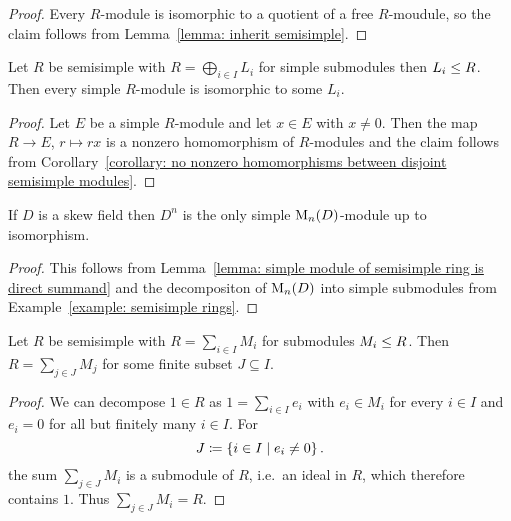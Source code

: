 \begin{proof}
  Every $R$-module is isomorphic to a quotient of a free $R$-moudule, so the claim follows from Lemma~\ref{lemma: inherit semisimple}.
\end{proof}


\begin{lemma}
  \label{lemma: simple module of semisimple ring is direct summand}
  Let $R$ be semisimple with $R = \bigoplus_{i \in I} L_i$ for simple submodules then $L_i \leq R$.
  Then every simple $R$-module is isomorphic to some $L_i$.
\end{lemma}


\begin{proof}
  Let $E$ be a simple $R$-module and let $x \in E$ with $x \neq 0$.
  Then the map $R \to E$, $r \mapsto rx$ is a nonzero homomorphism of $R$-modules and the claim follows from Corollary~\ref{corollary: no nonzero homomorphisms between disjoint semisimple modules}.
\end{proof}


\begin{corollary}
  \label{corollary: D^n is the only simple M_n(D)-module}
  If $D$ is a skew field then $D^n$ is the only simple $\operatorname{M}_n(D)$-module up to isomorphism.
\end{corollary}


\begin{proof}
  This follows from Lemma~\ref{lemma: simple module of semisimple ring is direct summand} and the decompositon of $\operatorname{M}_n(D)$ into simple submodules from Example~\ref{example: semisimple rings}.
\end{proof}


\begin{lemma}
  \label{lemma: ring is already finite sum of submodules}
  Let $R$ be semisimple with $R = \sum_{i \in I} M_i$ for submodules $M_i \leq R$.
  Then $R = \sum_{j \in J} M_j$ for some finite subset $J \subseteq I$.
\end{lemma}


\begin{proof}
  We can decompose $1 \in R$ as $1 = \sum_{i \in I} e_i$ with $e_i \in M_i$ for every $i \in I$ and $e_i = 0$ for all but finitely many $i \in I$.
  For
  \[
              J
    \coloneqq  \{ i \in I \mid e_i \neq 0 \} \,.
  \]
  the sum $\sum_{j \in J} M_i$ is a submodule of $R$, i.e.\ an ideal in $R$, which therefore contains $1$.
  Thus $\sum_{j \in J} M_i = R$.
\end{proof}


